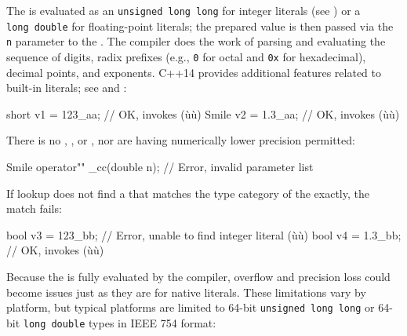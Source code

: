 \noindent The  is evaluated as an
\lstinline!unsigned!~\lstinline!long!~\lstinline!long! for integer literals (see ) or a
\lstinline!long!~\lstinline!double! for floating-point literals; the prepared
value is then passed via the \lstinline!n! parameter to the . The compiler does the work of parsing and evaluating the
sequence of digits, radix prefixes (e.g., \lstinline!0! for octal and
\lstinline!0x! for hexadecimal), decimal points, and exponents. C++14
provides additional features related to built-in
literals; see  and :

\begin{emcppslisting}[emcppsbatch=e10]
short v1 = 123_aa;  // OK, invokes (ù{}ù)
Smile v2 = 1.3_aa;  // OK, invokes (ù{}ù)
\end{emcppslisting}

\noindent There is no ,
, or
, nor are  having numerically lower precision permitted:

\begin{emcppslisting}[emcppsbatch=e10]
Smile operator"" _cc(double n);  // Error, invalid parameter list
\end{emcppslisting}

\noindent If lookup does not find a  that matches the type
category of the  exactly, the match fails:

\begin{emcppslisting}[emcppsbatch=e10]
bool v3 = 123_bb;  // Error, unable to find integer literal (ù{}ù)
bool v4 = 1.3_bb;  // OK, invokes (ù{}ù)
\end{emcppslisting}

\noindent Because the  is fully evaluated by the compiler,
overflow and precision loss could become issues just as they are for
native literals. These limitations vary by platform, but typical
platforms are limited to 64-bit
\lstinline!unsigned!~\lstinline!long!~\lstinline!long! or 64-bit
\lstinline!long!~\lstinline!double! types in IEEE
754 format:

